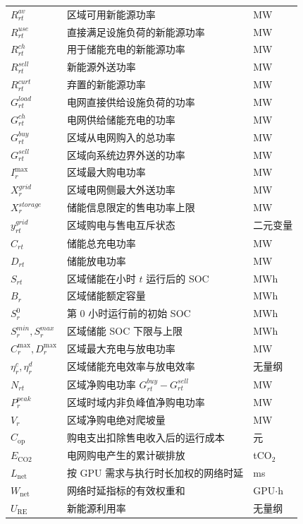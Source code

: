\documentclass[withoutpreface,bwprint]{cumcmthesis}
\begin{document}
\begin{longtable}{lll}
$R_{rt}^{av}$ & 区域可用新能源功率 & MW \\
$R_{rt}^{use}$ & 直接满足设施负荷的新能源功率 & MW \\
$R_{rt}^{ch}$ & 用于储能充电的新能源功率 & MW \\
$R_{rt}^{sell}$ & 新能源外送功率 & MW \\
$R_{rt}^{curt}$ & 弃置的新能源功率 & MW \\
$G_{rt}^{load}$ & 电网直接供给设施负荷的功率 & MW \\
$G_{rt}^{ch}$ & 电网供给储能充电的功率 & MW \\
$G_{rt}^{buy}$ & 区域从电网购入的总功率 & MW \\
$G_{rt}^{sell}$ & 区域向系统边界外送的功率 & MW \\
$I_r^{\max}$ & 区域最大购电功率 & MW \\
$X_r^{grid}$ & 区域电网侧最大外送功率 & MW \\
$X_r^{storage}$ & 储能信息限定的售电功率上限 & MW \\
$y_{rt}^{grid}$ & 区域购电与售电互斥状态 & 二元变量 \\
$C_{rt}$ & 储能总充电功率 & MW \\
$D_{rt}$ & 储能放电功率 & MW \\
$S_{rt}$ & 区域储能在小时 $t$ 运行后的 SOC & MWh \\
$B_r$ & 区域储能额定容量 & MWh \\
$S_r^0$ & 第 $0$ 小时运行前的初始 SOC & MWh \\
$S_r^{min},S_r^{max}$ & 区域储能 SOC 下限与上限 & MWh \\
$C_r^{\max},D_r^{\max}$ & 区域最大充电与放电功率 & MW \\
$\eta_r^c,\eta_r^d$ & 区域储能充电效率与放电效率 & 无量纲 \\
$N_{rt}$ & 区域净购电功率 $G_{rt}^{buy}-G_{rt}^{sell}$ & MW \\
$P_r^{peak}$ & 区域时域内非负峰值净购电功率 & MW \\
$V_r$ & 区域净购电绝对爬坡量 & MW \\
$C_{\mathrm{op}}$ & 购电支出扣除售电收入后的运行成本 & 元 \\
$E_{\mathrm{CO2}}$ & 电网购电产生的累计碳排放 & tCO$_2$ \\
$L_{\mathrm{net}}$ & 按 GPU 需求与执行时长加权的网络时延 & ms \\
$W_{\mathrm{net}}$ & 网络时延指标的有效权重和 & GPU$\cdot$h \\
$U_{\mathrm{RE}}$ & 新能源利用率 & 无量纲 \\

\end{longtable}
\end{document}
